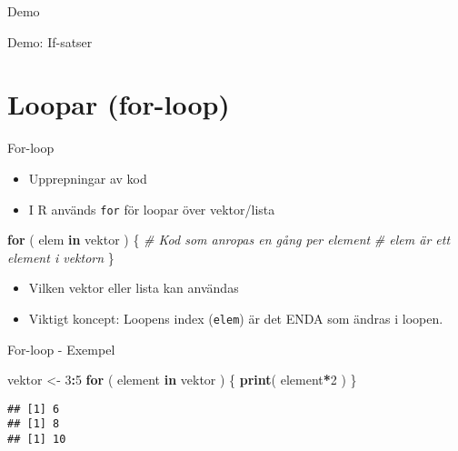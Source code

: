 \documentclass[
  11pt,
  ignorenonframetext,
]{beamer}
\newenvironment{Shaded}{\begin{snugshade}}{\end{snugshade}}
\newcommand{\CommentTok}[1]{\textcolor[rgb]{0.56,0.35,0.01}{\textit{#1}}}
\newcommand{\ControlFlowTok}[1]{\textcolor[rgb]{0.13,0.29,0.53}{\textbf{#1}}}
\newcommand{\DecValTok}[1]{\textcolor[rgb]{0.00,0.00,0.81}{#1}}
\newcommand{\FunctionTok}[1]{\textcolor[rgb]{0.13,0.29,0.53}{\textbf{#1}}}
\newcommand{\NormalTok}[1]{#1}
\newcommand{\OtherTok}[1]{\textcolor[rgb]{0.56,0.35,0.01}{#1}}
\newcommand{\SpecialCharTok}[1]{\textcolor[rgb]{0.81,0.36,0.00}{\textbf{#1}}}
\providecommand{\tightlist}{%
  \setlength{\itemsep}{0pt}\setlength{\parskip}{0pt}}
\begin{document}
\begin{frame}{Demo}
\label{demo}
\begin{block}{Demo: If-satser}
\label{demo-if-satser}
\end{block}
\end{frame}

\section{Loopar (for-loop)}\label{loopar-for-loop}

\begin{frame}[fragile]{For-loop}
\label{for-loop}
\begin{itemize}
\tightlist
\item
  Upprepningar av kod
\item
  I R används \texttt{for} för loopar över vektor/lista
\end{itemize}

\begin{Shaded}
\begin{Highlighting}[]
\ControlFlowTok{for}\NormalTok{ ( elem }\ControlFlowTok{in}\NormalTok{ vektor ) \{}
  \CommentTok{\# Kod som anropas en gång per element}
  \CommentTok{\# elem är ett element i vektorn}
\NormalTok{\}}
\end{Highlighting}
\end{Shaded}

\begin{itemize}
\tightlist
\item
  Vilken vektor eller lista kan användas
\item
  Viktigt koncept: Loopens index (\texttt{elem}) är det ENDA som ändras
  i loopen.
\end{itemize}
\end{frame}

\begin{frame}[fragile]{For-loop - Exempel}
\label{for-loop---exempel}
\begin{Shaded}
\begin{Highlighting}[]
\NormalTok{vektor }\OtherTok{\textless{}{-}} \DecValTok{3}\SpecialCharTok{:}\DecValTok{5}
\ControlFlowTok{for}\NormalTok{ ( element }\ControlFlowTok{in}\NormalTok{ vektor ) \{}
  \FunctionTok{print}\NormalTok{( element}\SpecialCharTok{*}\DecValTok{2}\NormalTok{ )}
\NormalTok{\}}
\end{Highlighting}
\end{Shaded}

\pause

\begin{verbatim}
## [1] 6
## [1] 8
## [1] 10
\end{verbatim}
\end{frame}
\end{document}
